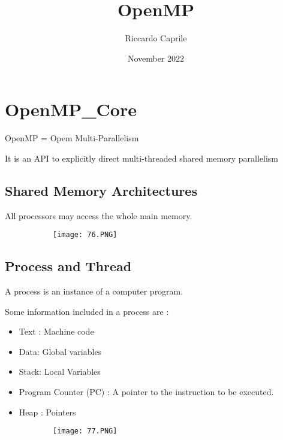\documentclass{article}
\title{OpenMP}
\author{Riccardo Caprile}
\date{November 2022}
\begin{document}
\maketitle
\vspace{150mm}



\section{OpenMP\_Core}

OpenMP = Opem Multi-Parallelism

It is an API to explicitly direct multi-threaded shared memory parallelism



\subsection{Shared Memory Architectures}

All processors may access the whole main memory.

\begin{figure}[ht!]
  \centering
  \begin{subfigure}[b]{0.7\linewidth}
    \texttt{[image: 76.PNG]}
  \end{subfigure}
\end{figure}

\subsection{Process and Thread}

A process is an instance of a computer program.

Some information included in a process are :

\begin{itemize}
    \item Text : Machine code
    \item Data: Global variables
    \item Stack: Local Variables
    \item Program Counter (PC) : A pointer to the instruction to be executed.
    \item Heap : Pointers
\end{itemize}

\begin{figure}[ht!]
  \centering
  \begin{subfigure}[b]{0.4\linewidth}
    \texttt{[image: 77.PNG]}
  \end{subfigure}
\end{figure}
\end{document}
